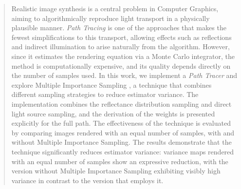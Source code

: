 \begin{abstract}
  Realistic image synthesis is a central problem in Computer Graphics, aiming
  to algorithmically reproduce light transport in a physically plausible
  manner. \emph{Path Tracing} is one of the approaches that makes the fewest
  simplifications to this transport, allowing effects such as reflections and
  indirect illumination to arise naturally from the algorithm. However, since
  it estimates the rendering equation \citep{kajiya86} via a Monte Carlo
  integrator, the method is computationally expensive, and its quality depends
  directly on the number of samples used. In this work, we implement a
  \emph{Path Tracer} and explore Multiple Importance Sampling \citep{veach95},
  a technique that combines different sampling strategies to reduce estimator
  variance. The implementation combines the reflectance distribution sampling
  and direct light source sampling, and the derivation of the weights is
  presented explicitly for the full path. The effectiveness of the technique is
  evaluated by comparing images rendered with an equal number of samples, with
  and without Multiple Importance Sampling. The results demonstrate that the
  technique significantly reduces estimator variance: variance maps rendered
  with an equal number of samples show an expressive reduction, with the
  version without Multiple Importance Sampling exhibiting visibly high variance
  in contrast to the version that employs it.

\end{abstract}
